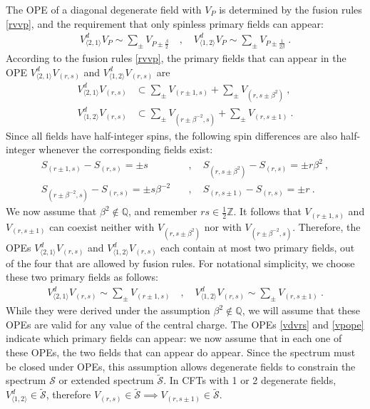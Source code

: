 \documentclass[12pt, a4paper]{article}
\theoremstyle{break}
\begin{document}
The OPE of a diagonal degenerate field with $V_P$ is determined by the fusion rules \eqref{rvvp}, and the requirement that only spinless primary fields can appear:
\begin{align}
 \boxed{V^d_{\langle 2,1\rangle} V_P \sim \sum_\pm V_{P\pm\frac{\beta}{2}}} \quad , \quad \boxed{V^d_{\langle 1,2\rangle} V_P \sim \sum_\pm V_{P\pm\frac{1}{2\beta}}} \ . 
 \label{vpope}
\end{align}
According to the fusion rules \eqref{rvvp}, the primary fields that can appear in the OPE $V^d_{\langle 2,1\rangle}V_{(r,s)}$ and $V^d_{\langle 1,2\rangle}V_{(r,s)}$ are 
\begin{align}
 V^d_{\langle 2,1\rangle}V_{(r,s)} &\subset \sum_\pm V_{(r\pm 1,s)} + \sum_\pm V_{(r,s\pm \beta^2)}\ ,
 \label{vtovrs}
 \\
 V^d_{\langle 1,2\rangle}V_{(r,s)} &\subset \sum_\pm V_{(r\pm \beta^{-2},s)} + \sum_\pm V_{(r,s\pm 1)}\ .
 \label{votvrs}
\end{align}
Since all fields have half-integer spins, the following spin differences are also half-integer whenever the corresponding fields exist: 
\begin{align}
 S_{(r\pm 1,s)} - S_{(r,s)} = \pm s &\quad , \quad S_{(r,s\pm \beta^2)} - S_{(r,s)} = \pm r\beta^2\ ,
 \label{sdiff1}
 \\
 S_{(r\pm \beta^{-2},s)} - S_{(r,s)} = \pm s\beta^{-2} &\quad , \quad S_{(r,s\pm 1)} - S_{(r,s)} = \pm r\ . 
 \label{sdiff2}
\end{align}
We now assume that $\beta^2\notin \mathbb{Q}$, and remember $rs\in\frac12\mathbb{Z}$. It follows that $V_{(r\pm 1,s)}$ and $V_{(r,s\pm 1)}$ can coexist neither with $V_{(r,s\pm \beta^2)}$ nor with $V_{(r\pm \beta^{-2},s)}$. Therefore, the OPEs $V^d_{\langle 2,1\rangle}V_{(r,s)}$ and $V^d_{\langle 1,2\rangle}V_{(r,s)}$ each contain at most two primary fields, out of the four that are allowed by fusion rules. For notational simplicity, we choose these two primary fields as follows: 
\begin{align}
 \boxed{V^d_{\langle 2,1\rangle}V_{(r,s)} \sim \sum_\pm V_{(r\pm 1,s)}} \quad ,\quad
 \boxed{V^d_{\langle 1,2\rangle}V_{(r,s)} \sim \sum_\pm V_{(r,s\pm 1)}}\ . 
 \label{vdvrs}
\end{align}
While they were derived under the assumption $\beta^2\notin \mathbb{Q}$, we will assume that these OPEs are valid for any value of the central charge. The OPEs \eqref{vdvrs} and \eqref{vpope} indicate which primary fields can appear: we now assume that in each one of these OPEs, the two fields that can appear do appear. Since the spectrum must be closed under OPEs, this assumption allows degenerate fields to constrain the spectrum $\mathcal{S}$ or extended spectrum $\widetilde{\mathcal{S}}$. In CFTs with 1 or 2 degenerate fields, $V^d_{\langle 1,2\rangle}\in\widetilde{\mathcal{S}}$, therefore $V_{(r,s)}\in\widetilde{\mathcal{S}}\implies V_{(r,s\pm 1)}\in\widetilde{\mathcal{S}}$. 
\end{document}
